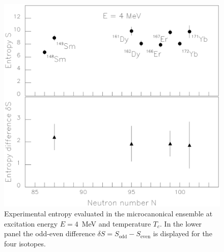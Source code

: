 \clearpage

\begin{figure}
\includegraphics[totalheight=20cm,angle=0,bb=0 20 350 730]{fig6.ps}
\caption{Experimental entropy evaluated in the microcanonical ensemble at 
excitation energy $E=4$~MeV and temperature $T_c$. In the lower panel the 
odd-even difference $\delta S=S_{\mathrm{odd}}-S_{\mathrm{even}}$ is displayed 
for the four isotopes.}
\label{fig:fig6}
\end{figure}





